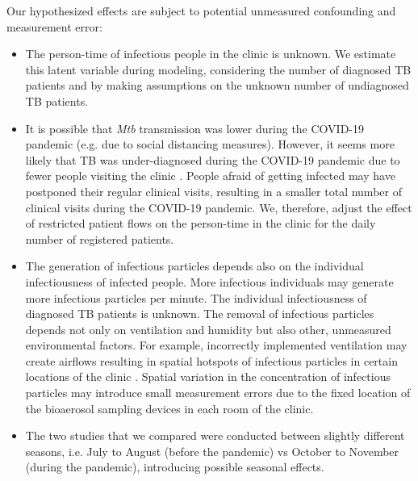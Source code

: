 \documentclass{article}
\begin{document}
Our hypothesized effects are subject to potential unmeasured confounding and measurement error: 

\begin{itemize}
    \item The person-time of infectious people in the clinic is unknown. We estimate this latent variable during modeling, considering the number of diagnosed TB patients and by making assumptions on the unknown number of undiagnosed TB patients. 
    \item It is possible that \emph{Mtb} transmission was lower during the COVID-19 pandemic (e.g. due to social distancing measures). However, it seems more likely that TB was under-diagnosed during the COVID-19 pandemic due to fewer people visiting the clinic \cite{Soko2021EID,Pillay2021SAMJ,Uwishema2022DMPHP}. People afraid of getting infected may have postponed their regular clinical visits, resulting in a smaller total number of clinical visits during the COVID-19 pandemic. We, therefore, adjust the effect of restricted patient flows on the person-time in the clinic for the daily number of registered patients.
    \item The generation of infectious particles depends also on the individual infectiousness of infected people. More infectious individuals may generate more infectious particles per minute. The individual infectiousness of diagnosed TB patients is unknown.
	The removal of infectious particles depends not only on ventilation and humidity but also other, unmeasured environmental factors. For example, incorrectly implemented ventilation may create airflows resulting in spatial hotspots of infectious particles in certain locations of the clinic \cite{Wang2021Science}. Spatial variation in the concentration of infectious particles may introduce small measurement errors due to the fixed location of the bioaerosol sampling devices in each room of the clinic. 
    \item The two studies that we compared were conducted between slightly different seasons, i.e. July to August (before the pandemic) vs October to November (during the pandemic), introducing possible seasonal effects.
\end{itemize}
\end{document}
